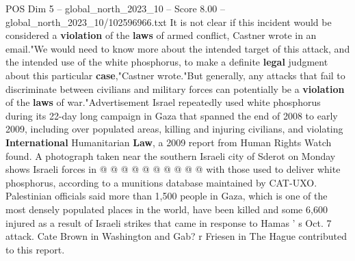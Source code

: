 \begin{textsample}{POS Dim 5 – global\_north\_2023\_10 – Score 8.00 – global\_north\_2023\_10/102596966.txt}
It is not clear if this incident would be considered a \textbf{violation} of the \textbf{laws} of armed conflict, Castner wrote in an email."We would need to know more about the intended target of this attack, and the intended use of the white phosphorus, to make a definite \textbf{legal} judgment about this particular \textbf{case},"Castner wrote."But generally, any attacks that fail to discriminate between civilians and military forces can potentially be a \textbf{violation} of the \textbf{laws} of war."Advertisement Israel repeatedly used white phosphorus during its 22-day long campaign in Gaza that spanned the end of 2008 to early 2009, including over populated areas, killing and injuring civilians, and violating \textbf{International} Humanitarian \textbf{Law}, a 2009 report from Human Rights Watch found.
A photograph taken near the southern Israeli city of Sderot on Monday shows Israeli forces in @ @ @ @ @ @ @ @ @ @ with those used to deliver white phosphorus, according to a munitions database maintained by CAT-UXO.
Palestinian officials said more than 1,500 people in Gaza, which is one of the most densely populated places in the world, have been killed and some 6,600 injured as a result of Israeli strikes that came in response to Hamas ' s Oct. 7 attack.
Cate Brown in Washington and Gab? r Friesen in The Hague contributed to this report.

\end{textsample}
